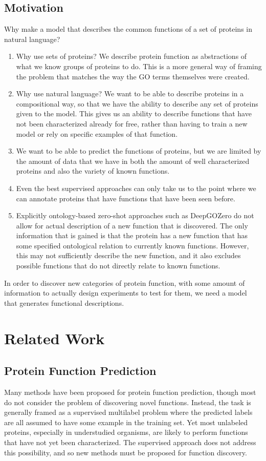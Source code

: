 \documentclass{specification}
\begin{document}
    \subsection{Motivation}
    Why make a model that describes the common functions of a set of proteins in natural language?
    \begin{enumerate}
        \item Why use sets of proteins? We describe protein function as abstractions of what we know groups of proteins to do. This is a more general way of framing the problem that matches the way the GO terms themselves were created.
        \item Why use natural language? We want to be able to describe proteins in a compositional way, so that we have the ability to describe any set of proteins given to the model. This gives us an ability to describe functions that have not been characterized already for free, rather than having to train a new model or rely on specific examples of that function.
        \item We want to be able to predict the functions of proteins, but we are limited by the amount of data that we have in both the amount of well characterized proteins and also the variety of known functions.
        \item Even the best supervised approaches can only take us to the point where we can annotate proteins that have functions that have been seen before.
        \item Explicitly ontology-based zero-shot approaches such as DeepGOZero \cite{DeepGOZero} do not allow for actual description of a new function that is discovered.
The only information that is gained is that the protein has a new function that has some specified ontological relation to currently known functions.
However, this may not sufficiently describe the new function, and it also excludes possible functions that do not directly relate to known functions.
    \end{enumerate}
    In order to discover new categories of protein function, with some amount of information to actually design experiments to test for them, we need a model that generates functional descriptions.

\section{Related Work}
\subsection{Protein Function Prediction}
Many methods have been proposed for protein function prediction, though most do not consider the problem of discovering novel functions.
Instead, the task is generally framed as a supervised multilabel problem where the predicted labels are all assumed to have some example in the training set.
Yet most unlabeled proteins, especially in understudied organisms, are likely to perform functions that have not yet been characterized.
The supervised approach does not address this possibility, and so new methods must be proposed for function discovery.
\end{document}

